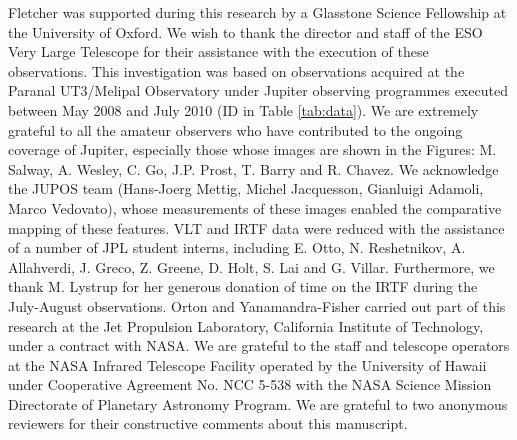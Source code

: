 \documentclass[final,5p,times,twocolumn,authoryear]{elsarticle}
\begin{document}
Fletcher was supported during this research by a Glasstone Science Fellowship at the University of Oxford.  We wish to thank the director and staff of the ESO Very Large Telescope for their assistance with the execution of these observations.  This investigation was based on observations acquired at the Paranal UT3/Melipal Observatory under Jupiter observing programmes executed between May 2008 and July 2010 (ID in Table \ref{tab:data}).  We are extremely grateful to all the amateur observers who have contributed to the ongoing coverage of Jupiter, especially those whose images are shown in the Figures: M. Salway, A. Wesley, C. Go, J.P. Prost, T. Barry and R. Chavez.  We acknowledge the JUPOS team (Hans-Joerg Mettig, Michel Jacquesson, Gianluigi Adamoli, Marco Vedovato), whose measurements of these images enabled the comparative mapping of these features.  VLT and IRTF data were reduced with the assistance of a number of JPL student interns, including E. Otto, N. Reshetnikov, A. Allahverdi, J. Greco, Z. Greene, D. Holt, S. Lai and G. Villar.  Furthermore, we thank M. Lystrup for her generous donation of time on the IRTF during the July-August observations.   Orton and Yanamandra-Fisher carried out part of this research at the Jet Propulsion Laboratory, California Institute of Technology, under a contract with NASA.  We are grateful to the staff and telescope operators at the NASA Infrared Telescope Facility operated by the University of Hawaii under Cooperative Agreement No. NCC 5-538 with the NASA Science Mission Directorate of Planetary Astronomy Program.  We are grateful to two anonymous reviewers for their constructive comments about this manuscript.








%





\renewcommand{\baselinestretch}{1}



\clearpage
\appendix
\end{document}
